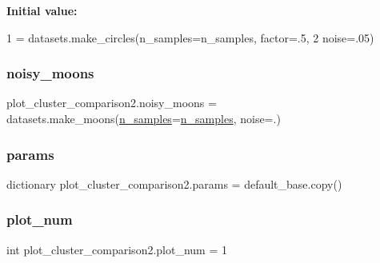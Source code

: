 {\bfseries Initial value\+:}
\begin{DoxyCode}
1 =  datasets.make\_circles(n\_samples=n\_samples, factor=.5,
2                                       noise=.05)
\end{DoxyCode}
\mbox{\label{namespaceplot__cluster__comparison2_a1780ed2b6f82e2a53c30cda12462a26b}} 
\subsubsection{\texorpdfstring{noisy\+\_\+moons}{noisy\_moons}}
{\footnotesize\ttfamily plot\+\_\+cluster\+\_\+comparison2.\+noisy\+\_\+moons = datasets.\+make\+\_\+moons(\hyperlink{namespaceplot__cluster__comparison2_ab79e3292af180973ba0da8e7c55b6d76}{n\+\_\+samples}=\hyperlink{namespaceplot__cluster__comparison2_ab79e3292af180973ba0da8e7c55b6d76}{n\+\_\+samples}, noise=.)}

\mbox{\label{namespaceplot__cluster__comparison2_a2c45c06ff9f589e117a4d45eca4dd71d}} 
\subsubsection{\texorpdfstring{params}{params}}
{\footnotesize\ttfamily dictionary plot\+\_\+cluster\+\_\+comparison2.\+params = default\+\_\+base.\+copy()}

\mbox{\label{namespaceplot__cluster__comparison2_ab8147a1c2c1d5b43b74b6dfd54b28202}} 
\subsubsection{\texorpdfstring{plot\+\_\+num}{plot\_num}}
{\footnotesize\ttfamily int plot\+\_\+cluster\+\_\+comparison2.\+plot\+\_\+num = 1}

